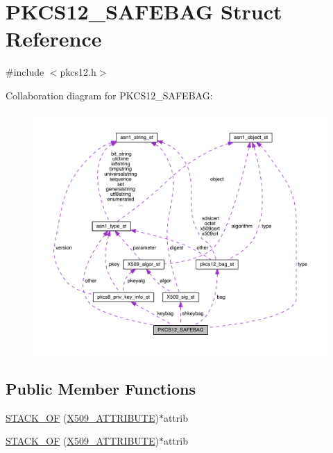 \hypertarget{struct_p_k_c_s12___s_a_f_e_b_a_g}{}\section{P\+K\+C\+S12\+\_\+\+S\+A\+F\+E\+B\+AG Struct Reference}
\label{struct_p_k_c_s12___s_a_f_e_b_a_g}


{\ttfamily \#include $<$pkcs12.\+h$>$}



Collaboration diagram for P\+K\+C\+S12\+\_\+\+S\+A\+F\+E\+B\+AG\+:\nopagebreak
\begin{figure}[H]
\begin{center}
\leavevmode
\includegraphics[width=350pt]{struct_p_k_c_s12___s_a_f_e_b_a_g__coll__graph}
\end{center}
\end{figure}
\subsection*{Public Member Functions}
\begin{DoxyCompactItemize}
\item 
\hyperlink{struct_p_k_c_s12___s_a_f_e_b_a_g_a5065889b5a96c47e6cdaecd780062b22}{S\+T\+A\+C\+K\+\_\+\+OF} (\hyperlink{crypto_2x509_2x509_8h_aa4f1a62a9d2dd8cb6780fe2713737c0f}{X509\+\_\+\+A\+T\+T\+R\+I\+B\+U\+TE})$\ast$attrib
\item 
\hyperlink{struct_p_k_c_s12___s_a_f_e_b_a_g_a5065889b5a96c47e6cdaecd780062b22}{S\+T\+A\+C\+K\+\_\+\+OF} (\hyperlink{crypto_2x509_2x509_8h_aa4f1a62a9d2dd8cb6780fe2713737c0f}{X509\+\_\+\+A\+T\+T\+R\+I\+B\+U\+TE})$\ast$attrib
\end{DoxyCompactItemize}
